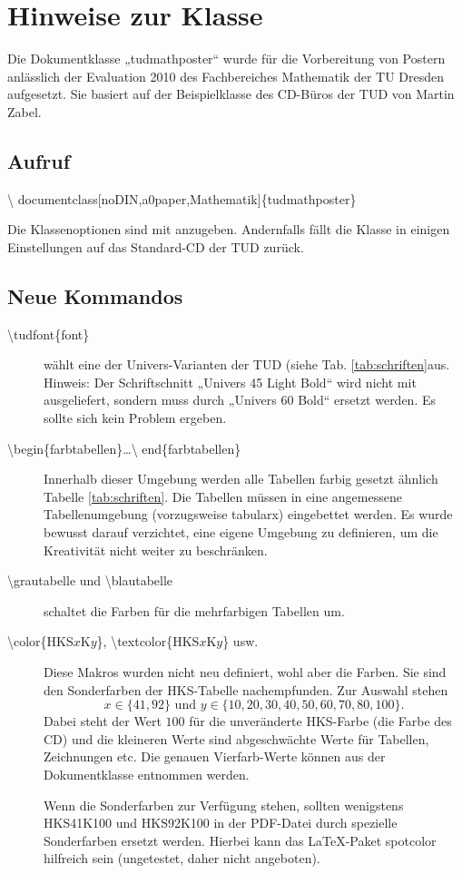 \documentclass[a0paper,noDIN,MathematikA0]{tudmathposter}
\begin{document}
\section{Hinweise zur Klasse}
\begin{multicols}{2}%
Die Dokumentklasse „tudmathposter“ wurde für die Vorbereitung von
Postern anlässlich der Evaluation 2010 des Fachbereiches Mathematik
der TU Dresden aufgesetzt. Sie basiert auf der Beispielklasse des
CD-Büros der TUD von Martin Zabel.

\subsection{Aufruf}

{\small\textbackslash
documentclass[noDIN,a0paper,Mathematik]\{tudmathposter\}}

Die Klassenoptionen sind mit anzugeben. Andernfalls fällt die Klasse
in einigen Einstellungen auf das Standard-CD der TUD zurück.
\subsection{Neue Kommandos}
\begin{description}
\item[\textbackslash tudfont\{font\}] wählt eine der Univers-Varianten
  der TUD (siehe Tab. \ref{tab:schriften}aus. Hinweis: Der Schriftschnitt „Univers 45 Light Bold“
  wird nicht mit ausgeliefert, sondern muss durch „Univers 60
  Bold“ ersetzt werden. Es sollte sich kein Problem ergeben.
\item[\textbackslash begin\{farbtabellen\}\dots\textbackslash
  end\{farbtabellen\}]
Innerhalb dieser Umgebung werden alle Tabellen farbig gesetzt ähnlich
Tabelle \ref{tab:schriften}. Die Tabellen müssen in eine angemessene
Tabellenumgebung (vorzugsweise tabularx) eingebettet werden. Es wurde bewusst darauf
verzichtet, eine eigene Umgebung zu definieren, um die Kreativität
nicht weiter zu beschränken.
\item[\textbackslash grautabelle und \textbackslash blautabelle]
  schaltet die Farben für die mehrfarbigen Tabellen um.
\item[\textbackslash color\{HKS$x$K$y$\}, \textbackslash textcolor\{HKS$x$K$y$\} usw.] Diese
  Makros wurden nicht neu definiert, wohl aber die Farben. Sie sind
  den Sonderfarben der HKS-Tabelle nachempfunden. Zur Auswahl stehen
  \[
  x\in\{41,92\}\text{ und } y\in \{10,20,30,40,50,60,70,80,100\}.
  \]
  Dabei
  steht der Wert $100$ für die unveränderte HKS-Farbe (die Farbe des
  CD) und die kleineren Werte sind abgeschwächte Werte für Tabellen,
  Zeichnungen etc. Die genauen Vierfarb-Werte können aus der
  Dokumentklasse entnommen werden. 

  Wenn die Sonderfarben zur Verfügung stehen, sollten wenigstens
  HKS41K100 und HKS92K100 in der PDF-Datei durch spezielle Sonderfarben
  ersetzt werden. Hierbei kann das \LaTeX-Paket spotcolor hilfreich
  sein (ungetestet, daher nicht angeboten).
\end{description}
\end{multicols}
\end{document}
